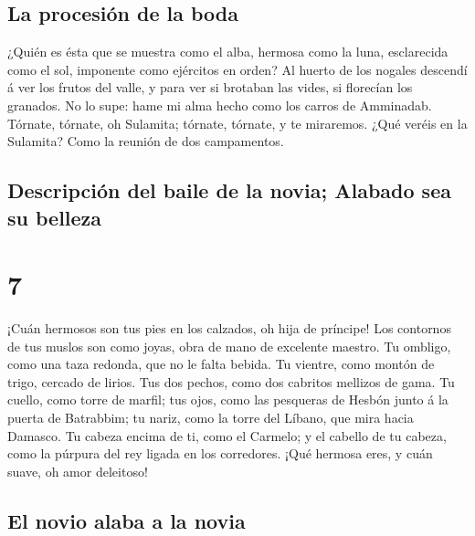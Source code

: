 \hypertarget{la-procesiuxf3n-de-la-boda}{%
\subsection{La procesión de la boda}\label{la-procesiuxf3n-de-la-boda}}

 ¿Quién es ésta que se muestra como el alba, hermosa como
la luna, esclarecida como el sol, imponente como ejércitos en orden?
 Al huerto de los nogales descendí á ver los frutos del
valle, y para ver si brotaban las vides, si florecían los granados.
 No lo supe: hame mi alma hecho como los carros de
Amminadab.  Tórnate, tórnate, oh Sulamita; tórnate,
tórnate, y te miraremos. ¿Qué veréis en la Sulamita? Como la reunión de
dos campamentos.

\hypertarget{descripciuxf3n-del-baile-de-la-novia-alabado-sea-su-belleza}{%
\subsection{Descripción del baile de la novia; Alabado sea su
belleza}\label{descripciuxf3n-del-baile-de-la-novia-alabado-sea-su-belleza}}

\hypertarget{section-6}{%
\section{7}\label{section-6}}

 ¡Cuán hermosos son tus pies en los calzados, oh hija de
príncipe! Los contornos de tus muslos son como joyas, obra de mano de
excelente maestro.  Tu ombligo, como una taza redonda, que
no le falta bebida. Tu vientre, como montón de trigo, cercado de lirios.
 Tus dos pechos, como dos cabritos mellizos de gama.
 Tu cuello, como torre de marfil; tus ojos, como las
pesqueras de Hesbón junto á la puerta de Batrabbim; tu nariz, como la
torre del Líbano, que mira hacia Damasco.  Tu cabeza encima
de ti, como el Carmelo; y el cabello de tu cabeza, como la púrpura del
rey ligada en los corredores.  ¡Qué hermosa eres, y cuán
suave, oh amor deleitoso!

\hypertarget{el-novio-alaba-a-la-novia}{%
\subsection{El novio alaba a la novia}\label{el-novio-alaba-a-la-novia}}

